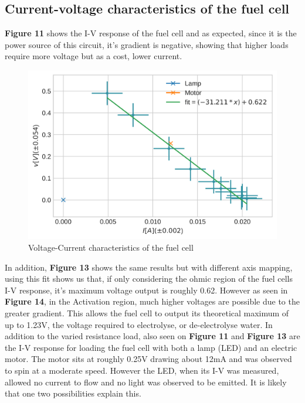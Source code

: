 \documentclass{article}
\begin{document}
    \subsection{Current-voltage characteristics of the fuel cell}
    \textbf{Figure 11} shows the I-V response of the fuel cell and as expected, since it is the power source of this circuit, 
    it's gradient is negative, showing that higher loads require more voltage but as a cost, lower current.
    \begin{figure}
        \centering
        \includegraphics[scale=0.9]{flipped.png}
        \caption{Voltage-Current characteristics of the fuel cell}
    \end{figure}
    In addition, \textbf{Figure 13} shows the same results but with different axis mapping, using this fit shows us that, if only considering the 
    ohmic region of the fuel cells I-V response, it's maximum voltage output is roughly 0.62. However as seen in \textbf{Figure 14}, in the Activation region, 
    much higher voltages are possible due to the greater gradient. This allows the fuel cell to output its theoretical maximum of up to 1.23V, the voltage required to 
    electrolyse, or de-electrolyse water.
    \newline \newline 
    In addition to the varied resistance load, also seen on \textbf{Figure 11} and \textbf{Figure 13} are the I-V response for loading the fuel cell with both a lamp (LED) 
    and an electric motor. The motor sits at roughly 0.25V drawing about 12mA and was observed to spin at a moderate speed. However the LED, when its I-V was measured, 
    allowed no current to flow and no light was observed to be emitted. It is likely that one two possibilities explain this.
\end{document}
